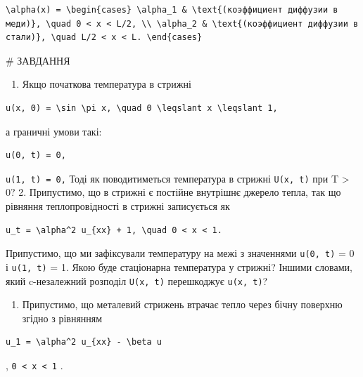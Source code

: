 \documentclass[
  ukrainian,
]{article}
\providecommand{\tightlist}{%
  \setlength{\itemsep}{0pt}\setlength{\parskip}{0pt}}
\begin{document}
\begin{verbatim}
\alpha(x) = \begin{cases} \alpha_1 & \text{(коэффициент диффузии в меди)}, \quad 0 < x < L/2, \\ \alpha_2 & \text{(коэффициент диффузии в стали)}, \quad L/2 < x < L. \end{cases}
\end{verbatim}

\# ЗАВДАННЯ

\begin{enumerate}
\def\labelenumi{\arabic{enumi}.}
\tightlist
\item
  Якщо початкова температура в стрижні
\end{enumerate}

\begin{verbatim}
u(x, 0) = \sin \pi x, \quad 0 \leqslant x \leqslant 1,
\end{verbatim}

а граничні умови такі:

\begin{verbatim}
u(0, t) = 0,
\end{verbatim}

\texttt{u(1,\ t)\ =\ 0,} Тоді як поводитиметься температура в стрижні
\texttt{U(x,\ t)} при T \textgreater{} 0? 2. Припустимо, що в стрижні є
постійне внутрішнє джерело тепла, так що рівняння теплопровідності в
стрижні записується як

\begin{verbatim}
u_t = \alpha^2 u_{xx} + 1, \quad 0 < x < 1.
\end{verbatim}

Припустимо, що ми зафіксували температуру на межі з значеннями
\texttt{u(0,\ t)} = 0 і \texttt{u(1,\ t)} = 1. Якою буде стаціонарна
температура у стрижні? Іншими словами, який c-незалежний розподіл
\texttt{U(x,\ t)} перешкоджує \texttt{u(x,\ t)}?

\begin{enumerate}
\def\labelenumi{\arabic{enumi}.}
\setcounter{enumi}{2}
\tightlist
\item
  Припустимо, що металевий стрижень втрачає тепло через бічну поверхню
  згідно з рівнянням
\end{enumerate}

\begin{verbatim}
u_1 = \alpha^2 u_{xx} - \beta u
\end{verbatim}

, \texttt{0\ \textless{}\ x\ \textless{}\ 1} .
\end{document}
